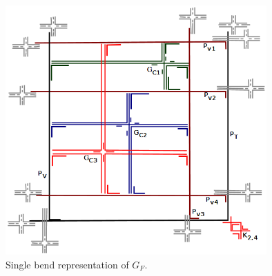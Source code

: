 \begin{figure}[htb]	
\center%
\includegraphics[width=10cm]{./img/formulaFGCompletaPies.png}
\caption{Single bend representation of $G_F$.}
\label{fig:gadgetFormulaCompletaPies}
\end{figure}